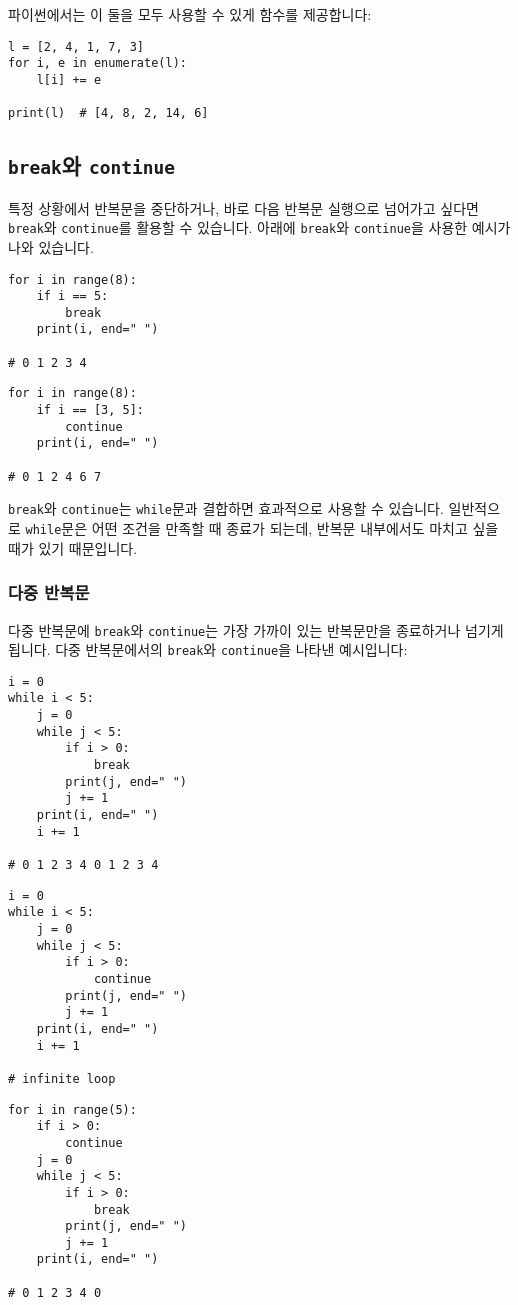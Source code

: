 \documentclass[../main.tex]{subfiles}
\begin{document}
파이썬에서는 이 둘을 모두 사용할 수 있게  함수를 제공합니다:
\begin{verbatim}
l = [2, 4, 1, 7, 3]
for i, e in enumerate(l):
    l[i] += e

print(l)  # [4, 8, 2, 14, 6]
\end{verbatim}

\subsection{\texttt{break}와 \texttt{continue}}
특정 상황에서 반복문을 중단하거나, 바로 다음 반복문 실행으로 넘어가고 싶다면 \texttt{break}와 \texttt{continue}를 활용할 수 있습니다.
아래에 \texttt{break}와 \texttt{continue}을 사용한 예시가 나와 있습니다.
\begin{verbatim}
for i in range(8):
    if i == 5:
        break
    print(i, end=" ")

# 0 1 2 3 4
\end{verbatim}
\begin{verbatim}
for i in range(8):
    if i == [3, 5]:
        continue
    print(i, end=" ")

# 0 1 2 4 6 7
\end{verbatim}

\texttt{break}와 \texttt{continue}는 \texttt{while}문과 결합하면 효과적으로 사용할 수 있습니다.
일반적으로 \texttt{while}문은 어떤 조건을 만족할 때 종료가 되는데, 반복문 내부에서도 마치고 싶을 때가 있기 때문입니다.

\subsubsection{다중 반복문}
다중 반복문에 \texttt{break}와 \texttt{continue}는 가장 가까이 있는 반복문만을 종료하거나 넘기게 됩니다.
다중 반복문에서의 \texttt{break}와 \texttt{continue}을 나타낸 예시입니다:
\begin{verbatim}
i = 0
while i < 5:
    j = 0
    while j < 5:
        if i > 0:
            break
        print(j, end=" ")
        j += 1
    print(i, end=" ")
    i += 1

# 0 1 2 3 4 0 1 2 3 4
\end{verbatim}
\begin{verbatim}
i = 0
while i < 5:
    j = 0
    while j < 5:
        if i > 0:
            continue
        print(j, end=" ")
        j += 1
    print(i, end=" ")
    i += 1

# infinite loop
\end{verbatim}
\begin{verbatim}
for i in range(5):
    if i > 0:
        continue
    j = 0
    while j < 5:
        if i > 0:
            break
        print(j, end=" ")
        j += 1
    print(i, end=" ")

# 0 1 2 3 4 0
\end{verbatim}
\end{document}

